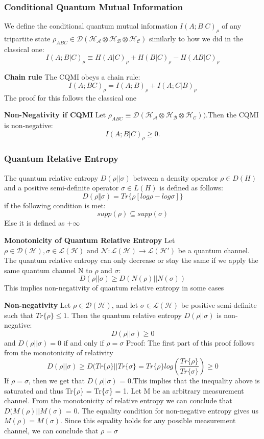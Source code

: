 \subsubsection{Conditional Quantum Mutual Information}
We define the conditional quantum mutual information $I(A;B|C)_\rho$ of any tripartite state $\rho_{ABC} \in \mathcal{D}(\mathcal{H_A} \otimes \mathcal{H_B} \otimes \mathcal{H_C})$ similarly to how we did in the classical one:
\[
I(A;B|C)_\rho \equiv H(A|C)_\rho + H(B|C)_\rho - H(AB|C)_\rho
\]

\textbf{Chain rule}
The CQMI obeys a chain rule:
\[
I(A;BC)_\rho = I(A;B)_\rho + I(A;C|B)_\rho
\]
The proof for this follows the classical one


\textbf{Non-Negativity if CQMI}
Let $\rho _{ABC} \equiv \mathcal{D}(\mathcal{H_A} \otimes \mathcal{H_B} \otimes \mathcal{H_C}))$.Then the CQMI is non-negative:
\[
I(A;B|C)_\rho \geq 0.
\]

\subsubsection{Quantum Relative Entropy}
The quantum relative entropy $D(\rho||\sigma)$ between a density operator $\rho \in D(H)$ and a positive semi-definite operator $\sigma \in L(H)$ is defined as follows:
\[
D(\rho \Vert \sigma) = Tr\{\rho[log\rho - log\sigma]\}
\]
if the following condition is met:
\[
supp(\rho) \subseteq supp(\sigma)
\]
Else it is defined as +$\infty$
\newline
\newline

\textbf{Monotonicity of Quantum Relative Entropy}
Let $\rho \in \mathcal{D}(\mathcal{H}), \sigma \in \mathcal{L}(\mathcal{H}) \text{ and } \mathcal{N}:\mathcal{L}(\mathcal{H}) \rightarrow \mathcal{L}(\mathcal{H}\prime)$ be a quantum channel. The quantum relative entropy can only decrease or stay the same if we apply the same quantum channel N to $\rho$ and $\sigma$:
\[
D(\rho||\sigma) \geq D(N(\rho)||N(\sigma))
\]
This implies non-negativity of quantum relative entropy in some cases

\textbf{Non-negativity}
Let $\rho \in \mathcal{D}(\mathcal{H})$, and let $\sigma \in \mathcal{L}(\mathcal{H})$ be positive semi-definite such that $Tr\{\rho\} \leq 1$. Then the quantum relative entropy $D(\rho||\sigma)$ is non-negative:
\[
D(\rho||\sigma) \geq 0
\]
and $D(\rho||\sigma) = 0$ if and only if $\rho = \sigma$
\newline
\newline
Proof:
The first part of this proof follows from the monotonicity of relativity
\[
D(\rho||\sigma) \geq D(Tr\{\rho\}||Tr\{\sigma\} = Tr\{\rho\}log\left(\frac{Tr\{\rho\}}{Tr\{\sigma\}}\right) \geq 0
\]
If $\rho = \sigma$, then we get that $D(\rho||\sigma)$ = 0.This implies that the inequality above is saturated and thus Tr\{$\rho$\} = Tr\{$\sigma$\} = 1. Let M be an arbitrary measurement channel. From the monotonicity of relative entropy we can conclude that $D(M(\rho)||M(\sigma)$ = 0. The equality condition for non-negative entropy gives us $M(\rho) = M(\sigma)$. Since this equality holds for any possible measurement channel, we can conclude that $\rho = \sigma$
\newline

